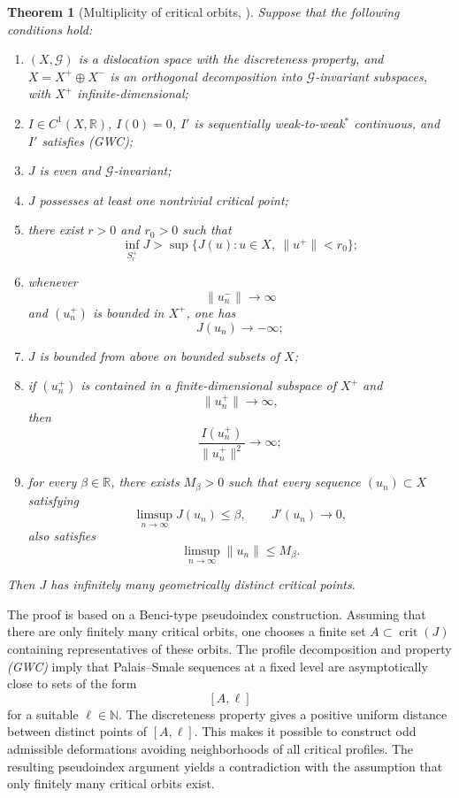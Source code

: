 \documentclass[10pt,a4paper]{amsart}
\numberwithin{equation}{section}
\newtheorem{theorem}{Theorem}[section]
\newcommand{\R}{\mathbb{R}}
\newcommand{\N}{\mathbb{N}}
\newcommand{\cG}{\mathcal{G}}
\newcommand{\crit}{\operatorname{crit}}
\begin{document}
\begin{theorem}[Multiplicity of critical orbits, {\cite[Theorem 3.2]{BBS2025}}]\label{thm:multiplicity-abstract}
Suppose that the following conditions hold:
\begin{enumerate}[label=\textup{(A\arabic*)}]
\item
$(X,\cG)$ is a dislocation space with the discreteness property, and
$X=X^+\oplus X^-$ is an orthogonal decomposition into $\cG$-invariant
subspaces, with $X^+$ infinite-dimensional;

\item
$I\in C^1(X,\R)$, $I(0)=0$, $I'$ is sequentially weak-to-weak$^*$
continuous, and $I'$ satisfies (GWC);

\item
$J$ is even and $\cG$-invariant;

\item
$J$ possesses at least one nontrivial critical point;

\item
there exist $r>0$ and $r_0>0$ such that
\[
\inf_{S_r^+}J
>
\sup\{J(u):u\in X,\ \|u^+\|<r_0\};
\]

\item
whenever
\[
\|u_n^-\|\to\infty
\]
and $(u_n^+)$ is bounded in $X^+$, one has
\[
J(u_n)\to-\infty;
\]

\item
$J$ is bounded from above on bounded subsets of $X$;

\item
if $(u_n^+)$ is contained in a finite-dimensional subspace of $X^+$ and
\[
\|u_n^+\|\to\infty,
\]
then
\[
\frac{I(u_n^+)}{\|u_n^+\|^2}\to\infty;
\]

\item
for every $\beta\in\R$, there exists $M_\beta>0$ such that every sequence
$(u_n)\subset X$ satisfying
\[
\limsup_{n\to\infty}J(u_n)\leq\beta,
\qquad
J'(u_n)\to0,
\]
also satisfies
\[
\limsup_{n\to\infty}\|u_n\|\leq M_\beta.
\]
\end{enumerate}
Then $J$ has infinitely many geometrically distinct critical points.
\end{theorem}

The proof is based on a Benci-type pseudoindex construction. Assuming that
there are only finitely many critical orbits, one chooses a finite set
$A\subset\crit(J)$ containing representatives of these orbits. The profile
decomposition and property \emph{(GWC)} imply that Palais--Smale sequences
at a fixed level are asymptotically close to sets of the form
\[
[A,\ell]
\]
for a suitable $\ell\in\N$. The discreteness property gives a positive
uniform distance between distinct points of $[A,\ell]$. This makes it
possible to construct odd admissible deformations avoiding neighborhoods
of all critical profiles. The resulting pseudoindex argument yields a
contradiction with the assumption that only finitely many critical orbits
exist.
\end{document}
